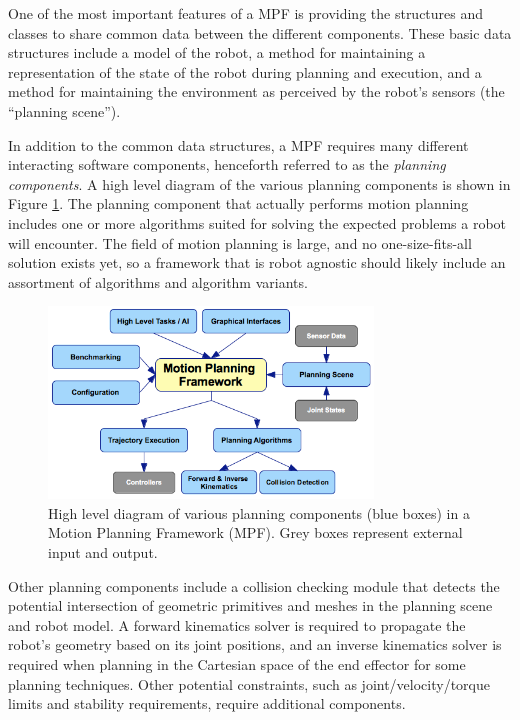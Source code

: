 \documentclass[10pt,journal,compsoc]{joser1}
\begin{document}
{One of the most important features of a MPF is providing the structures and
classes to share common data between the different components. These basic data
structures include a model of the robot, a method for maintaining a
representation of the state of the robot during planning and execution, and a
method for maintaining the environment as perceived by the robot's sensors (the
``planning scene'').

In addition to the common data structures, a MPF requires many different
interacting software components, henceforth referred to as the \textit{planning
components}. A high level diagram of the various planning components is shown in
Figure \ref{fig:motionplanning_highlevel}. The planning component that actually
performs motion planning includes one or more algorithms suited for solving the
expected problems a robot will encounter. The field of motion planning is large,
and no one-size-fits-all solution exists yet, so a framework that is robot
agnostic should likely include an assortment of algorithms and algorithm
variants.

\begin{figure}[!t]
\centering
\includegraphics[width=3.4in]{coleman_20131110_f05}
\caption{High level diagram of various planning components (blue boxes) in a Motion Planning
Framework (MPF). Grey boxes represent external input and output.}
\label{fig:motionplanning_highlevel}
\end{figure} 

Other planning components include a collision checking module that detects the
potential intersection of geometric primitives and meshes in the planning scene
and robot model. A forward kinematics solver is required to propagate the
robot's geometry based on its joint positions, and an inverse kinematics solver
is required when planning in the Cartesian space of the end effector for some planning techniques. Other potential constraints, such as
joint/velocity/torque limits and stability requirements, require additional
components.

}
\end{document}
